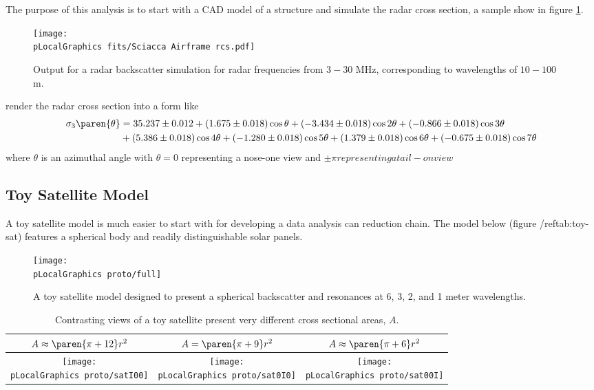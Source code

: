The purpose of this analysis is to start with a CAD model of a structure and simulate the radar cross section, a sample show in figure \ref{fig:mural}.
\begin{figure}[htbp] 
   \centering
   \texttt{[image: \\pLocalGraphics fits/Sciacca Airframe rcs.pdf]} 
   \caption{Output for a radar backscatter simulation for radar frequencies from $3 - 30$ MHz, corresponding to wavelengths of $10-100$ m.}
   \label{fig:mural}
\end{figure}

 render the radar cross section into a form like
	\begin{equation*}
		\begin{split}
			\sigma_{3}\paren{\theta} &= 35.237 \pm 0.012   +  (1.675 \pm 0.018) \cos \theta  +  (-3.434 \pm 0.018) \cos 2\theta  +  (-0.866 \pm 0.018) \cos 3\theta   \\
			&+  (5.386 \pm 0.018) \cos 4\theta  +  (-1.280 \pm 0.018) \cos 5\theta  +  (1.379 \pm 0.018) \cos 6\theta +   (-0.675 \pm 0.018) \cos 7\theta
		\end{split}
	\end{equation*}	
where $\theta$ is an azimuthal angle with $\theta=0$ representing a nose-one view and $\pm \pi representing a tail-on view$


\subsection{Toy Satellite Model}
A toy satellite model is much easier to start with for developing a data analysis can reduction chain. The model below (figure /ref{tab:toy-sat}) features a spherical body and readily distinguishable solar panels.
\begin{figure}[htbp]
\begin{center}
		\texttt{[image: \\pLocalGraphics proto/full]} 
\caption{A toy satellite model designed to present a spherical backscatter and resonances at 6, 3, 2, and 1 meter wavelengths.}
\label{tab:toy-sat}
\end{center}
\end{figure}

\begin{table}[htp]
\caption{Contrasting views of a toy satellite present very different cross sectional areas, $A$.}
\begin{center}
\begin{tabular}{ccc}
		$A \approx \paren{\pi  + 12}r^{2}$ & $A = \paren{\pi  + 9}r^{2}$ & $A \approx \paren{\pi  + 6}r^{2}$ \\\hline
		\texttt{[image: \\pLocalGraphics proto/satI00]}  & 
		\texttt{[image: \\pLocalGraphics proto/sat0I0]}   &
		\raisebox{3in}{\texttt{[image: \\pLocalGraphics proto/sat00I]}} 	\\
\end{tabular}
\end{center}
\label{tab:views}
\end{table}%



\endinput  %
